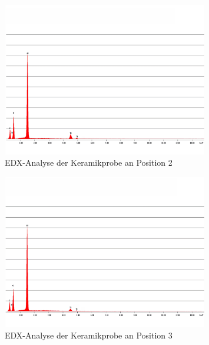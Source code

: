 \documentclass[12pt,english,ngerman]{scrartcl}
\begin{document}
\begin{figure}[H]
	\begin{center}
		\includegraphics[width =0.8\textwidth]{./figures/edx2.png}
	\end{center}
	\caption{EDX-Analyse der Keramikprobe an Position 2 \cite{sein_foto}}
    \label{fig:position2}
\end{figure}
\begin{figure}[H]
	\begin{center}
		\includegraphics[width =0.8\textwidth]{./figures/edx3.png}
	\end{center}
	\caption{EDX-Analyse der Keramikprobe an Position 3 \cite{sein_foto}}
    \label{fig:position3}
\end{figure}
\end{document}

